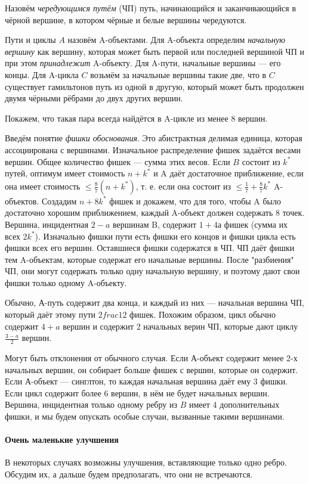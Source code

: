 Назовём \textit{чередующимся путём} (ЧП) путь, начинающийся и заканчивающийся в чёрной вершине, в котором чёрные и белые вершины чередуются.

Пути и циклы $A$ назовём A-объектами. Для A-объекта определим \textit{начальную вершину} как вершину, которая может быть первой или последней вершиной ЧП и при этом \textit{принадлежит} A-объекту. Для A-пути, начальные вершины --- его концы. Для A-цикла $C$ возьмём за начальные вершины такие две, что в $C$ существует гамильтонов путь из одной в другую, который может быть продолжен двумя чёрными рёбрами до двух других вершин. 

Покажем, что такая пара всегда найдётся в A-цикле из менее 8 вершин.

Введём понятие \textit{фишки обоснования}. Это абистрактная делимая единица, которая ассоциирована с вершинами. Изначальное распределение фишек задаётся весами вершин. Общее количество фишек --- сумма этих весов.
Если $B$ состоит из $k^*$ путей, оптимум имеет стоимость $n+k^*$ и A даёт достаточное приближение, если она имеет стоимость $\le \frac{8}{7}(n+k^*)$, т. е. если она состоит из $\le \frac{1}{7} + \frac{8}{7}k^*$ A-объектов. Создадим $n+8k^*$ фишек и докажем, что для того, чтобы A было достаточно хорошим приближением, каждый A-объект должен содержать 8 точек.
Вершина, инцидентная $2-a$ вершинам B, содержит $1+4а$ фишек (сумма их всех $2k^*$). Изначально фишки пути есть фишки его концов и фишки цикла есть фишки всех его вершин. Оставшиеся фишки содержатся в ЧП. ЧП даёт фишки тем A-объектам, которые содержат его начальные вершины. После "разбиения" ЧП, они могут содержать только одну начальную вершину, и поэтому дают свои фишки только одному A-объекту.

Обычно, А-путь содержит два конца, и каждый из них --- начальная вершина ЧП, который даёт этому пути $2
frac{1}{2}$ фишек. Похожим образом, цикл обычно содержит $4+a$ вершин и содержит 2 начальных верин ЧП, которые дают циклу $\frac{3-a}{2}$ вершин. 

Могут быть отклонения от обычного случая. Если А-объект содержит менее 2-х начальных вершин, он собирает больше фишек с вершин, которые он содержит. Если А-объект --- синглтон, то каждая начальная вершина даёт ему 3 фишки. Если цикл содержит более 6 вершин, в нём не будет начальных вершин. Вершина, инцидентная только одному ребру из $B$ имеет 4 дополнительных фишки, и мы будем опускать особые случаи, вызванные такими вершинами.

\paragraph{Очень маленькие улучшения}
В некоторых случаях возможны улучшения, вставляющие только одно ребро. Обсудим их, а дальше будем предполагать, что они не встречаются.

